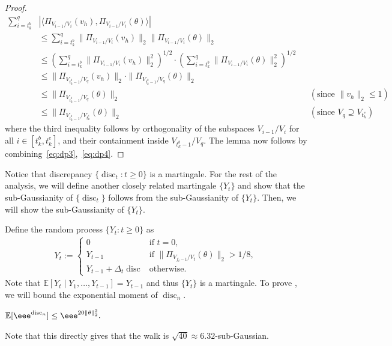\documentclass{toc}
\newcommand\E{\mathbb{E}}
\DeclareMathOperator{\disc}{disc}   %
\newcommand{\ip}[2]{\langle #1, #2 \rangle}
\begin{document}
\begin{proof}
\begin{align}
\sum_{i=t^b_k}^{q} &\left|\ip{\Pi_{V_{i-1}/V_i}(v_h)}{\Pi_{V_{i-1}/V_i}(\theta)}\right|
  &\\
  &\leq \sum_{i=t^b_k}^{q}
\|\Pi_{V_{i-1}/V_i}(v_h)\|_2 \|\Pi_{V_{i-1}/V_i}(\theta)\|_2 \nonumber \\
&\leq \left(\sum_{i=t^b_k}^{q}
\|\Pi_{V_{i-1}/V_i}(v_h)\|_2^2\right)^{1/2} \cdot \left(\sum_{i=t^b_k}^{q} \|\Pi_{V_{i-1}/V_i}(\theta)\|_2^2\right)^{1/2}\nonumber \\
&\leq \|\Pi_{V_{t^b_k-1}/V_{q}}(v_h)\|_2 \cdot \|\Pi_{V_{t^b_k-1}/V_{q}}(\theta)\|_2\nonumber \\
&\leq  \|\Pi_{V_{t^b_k-1}/V_{q}}(\theta)\|_2 && \left(\text{since } \|v_h\|_2 \leq 1\right) \nonumber \\
&\leq  \|\Pi_{V_{t^b_k-1}/V_{t^e_k}}(\theta)\|_2 && \left(\text{since } V_q\supseteq V_{t^e_k}\right) \label{eq:dp4}
\end{align}
where the third inequality follows by orthogonality of the subspaces
$V_{i-1}/V_i$ for all $i \in [t^b_k,t^e_k]$, and their containment inside
$V_{t^b_k-1}/V_{q}$. The lemma now follows by combining~\eqref{eq:dp3},~\eqref{eq:dp4}.
\end{proof}

Notice that discrepancy $\{\disc_t: t \ge 0\}$ is a martingale. For the rest of the
analysis, we will define another closely related martingale $\{Y_t\}$ and show
that the sub-Gaussianity of $\{\disc_t\}$ follows from the sub-Gaussianity of $\{Y_t\}$. 
Then, we will show the sub-Gaussianity of $\{Y_t\}$.

Define the random process $\{Y_t:  t\ge 0\}$ as
\begin{align*}
Y_t :=
	\begin{cases}
		0  & \mbox{if } t=0, \\
		Y_{t-1} & \mbox{if } \| \Pi_{V_{f_t-1}/V_{t}} (\theta) \|_2 > 1/8, \\
		Y_{t-1}+ \Delta_t \disc & \text{otherwise.}
	\end{cases}
\end{align*}
Note that $\E[Y_t\mid Y_1,\ldots,Y_{t-1}] = Y_{t-1}$ and thus $\{Y_t\}$ is a martingale.
To prove , we will bound the exponential moment of $\disc_n$.

\begin{theorem}
\label{thm:moment-bound}
$ \E[\eee^{\disc_n}] \le \eee^{20 \|\theta\|_2^2}. $
\end{theorem}
Note that this directly gives that the walk is $\sqrt{40} \approx 6.32$-sub-Gaussian.
\end{document}
